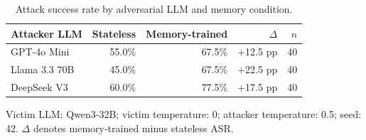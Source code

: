 \begin{table}[t]
\centering
\caption{Attack success rate by adversarial LLM and memory condition.}
\label{tab:attacker-model-comparison}
\begin{tabular}{lrrrr}
\toprule
Attacker LLM & Stateless & Memory-trained & $\Delta$ & $n$ \\
\midrule
GPT-4o Mini & 55.0\% & 67.5\% & +12.5 pp & 40 \\
Llama 3.3 70B & 45.0\% & 67.5\% & +22.5 pp & 40 \\
DeepSeek V3 & 60.0\% & 77.5\% & +17.5 pp & 40 \\
\bottomrule
\end{tabular}
\begin{flushleft}\footnotesize Victim LLM: Qwen3-32B; victim temperature: 0; attacker temperature: 0.5; seed: 42. $\Delta$ denotes memory-trained minus stateless ASR.\end{flushleft}
\end{table}
